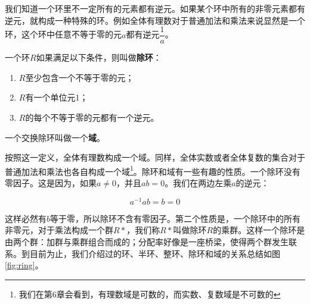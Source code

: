 \documentclass[b5paper]{ctexart}
\begin{document}
我们知道一个环里不一定所有的元素都有逆元。如果某个环中所有的非零元素都有逆元，就构成一种特殊的环。例如全体有理数对于普通加法和乘法来说显然是一个环，这个环中任意不等于零的元$a$都有逆元$\dfrac{1}{a}$。

\begin{definition}
一个环$R$如果满足以下条件，则叫做\textbf{除环}：
\begin{enumerate}
\item $R$至少包含一个不等于零的元；
\item $R$有一个单位元1；
\item $R$的每个不等于零的元都有一个逆元。
\end{enumerate}
\end{definition}

\begin{definition}
一个交换除环叫做一个\textbf{域}。
\end{definition}

按照这一定义，全体有理数构成一个域。同样，全体实数或者全体复数的集合对于普通加法和乘法也各自构成一个域\footnote{我们在第6章会看到，有理数域是可数的，而实数、复数域是不可数的}。除环和域有一些有趣的性质。一个除环没有零因子。这是因为，如果$a \neq 0$，并且$ab = 0$。我们在两边左乘$a$的逆元：

\[
a^{-1}ab = b = 0
\]

这样必然有$b$等于零，所以除环不含有零因子。第二个性质是，一个除环中的所有非零元，对于乘法构成一个群$R*$，我们称$R*$叫做除环$R$的乘群。这样一个除环是由两个群：加群与乘群组合而成的；分配率好像是一座桥梁，使得两个群发生联系。到目前为止，我们介绍过的环、半环、整环、除环和域的关系总结如图\ref{fig:ring}。
\end{document}
